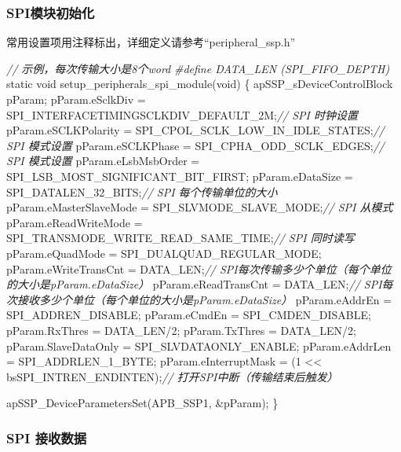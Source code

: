 \documentclass[
  12pt,
]{book}
\newenvironment{Shaded}{\begin{snugshade}}{\end{snugshade}}
\newcommand{\CommentTok}[1]{\textcolor[rgb]{0.56,0.35,0.01}{\textit{#1}}}
\newcommand{\DataTypeTok}[1]{\textcolor[rgb]{0.13,0.29,0.53}{#1}}
\newcommand{\DecValTok}[1]{\textcolor[rgb]{0.00,0.00,0.81}{#1}}
\newcommand{\NormalTok}[1]{#1}
\newcommand{\PreprocessorTok}[1]{\textcolor[rgb]{0.56,0.35,0.01}{\textit{#1}}}
\begin{document}
\hypertarget{spiux6a21ux5757ux521dux59cbux5316-5}{%
\subsubsection{SPI模块初始化}\label{spiux6a21ux5757ux521dux59cbux5316-5}}

常用设置项用注释标出，详细定义请参考``peripheral\_ssp.h''

\begin{Shaded}
\begin{Highlighting}[]
\CommentTok{// 示例，每次传输大小是8个word}
\PreprocessorTok{#define DATA_LEN (SPI_FIFO_DEPTH)}
\DataTypeTok{static} \DataTypeTok{void}\NormalTok{ setup_peripherals_spi_module(}\DataTypeTok{void}\NormalTok{)}
\NormalTok{\{}
\NormalTok{    apSSP_sDeviceControlBlock pParam;}
\NormalTok{    pParam.eSclkDiv = SPI_INTERFACETIMINGSCLKDIV_DEFAULT_2M;}\CommentTok{// SPI 时钟设置}
\NormalTok{    pParam.eSCLKPolarity = SPI_CPOL_SCLK_LOW_IN_IDLE_STATES;}\CommentTok{// SPI 模式设置}
\NormalTok{    pParam.eSCLKPhase = SPI_CPHA_ODD_SCLK_EDGES;}\CommentTok{// SPI 模式设置}
\NormalTok{    pParam.eLsbMsbOrder = SPI_LSB_MOST_SIGNIFICANT_BIT_FIRST;}
\NormalTok{    pParam.eDataSize = SPI_DATALEN_32_BITS;}\CommentTok{// SPI 每个传输单位的大小}
\NormalTok{    pParam.eMasterSlaveMode = SPI_SLVMODE_SLAVE_MODE;}\CommentTok{// SPI 从模式}
\NormalTok{    pParam.eReadWriteMode = SPI_TRANSMODE_WRITE_READ_SAME_TIME;}\CommentTok{// SPI 同时读写}
\NormalTok{    pParam.eQuadMode = SPI_DUALQUAD_REGULAR_MODE;}
\NormalTok{    pParam.eWriteTransCnt = DATA_LEN;}\CommentTok{// SPI每次传输多少个单位（每个单位的大小是pParam.eDataSize）}
\NormalTok{    pParam.eReadTransCnt = DATA_LEN;}\CommentTok{// SPI每次接收多少个单位（每个单位的大小是pParam.eDataSize）}
\NormalTok{    pParam.eAddrEn = SPI_ADDREN_DISABLE;}
\NormalTok{    pParam.eCmdEn = SPI_CMDEN_DISABLE;}
\NormalTok{    pParam.RxThres = DATA_LEN/}\DecValTok{2}\NormalTok{;}
\NormalTok{    pParam.TxThres = DATA_LEN/}\DecValTok{2}\NormalTok{;}
\NormalTok{    pParam.SlaveDataOnly = SPI_SLVDATAONLY_ENABLE;}
\NormalTok{    pParam.eAddrLen = SPI_ADDRLEN_1_BYTE;}
\NormalTok{    pParam.eInterruptMask = (}\DecValTok{1}\NormalTok{ << bsSPI_INTREN_ENDINTEN);}\CommentTok{// 打开SPI中断（传输结束后触发）}
  
\NormalTok{    apSSP_DeviceParametersSet(APB_SSP1, &pParam);}
\NormalTok{\}}
\end{Highlighting}
\end{Shaded}

\hypertarget{spi-ux63a5ux6536ux6570ux636e-2}{%
\subsubsection{SPI 接收数据}\label{spi-ux63a5ux6536ux6570ux636e-2}}
\end{document}
